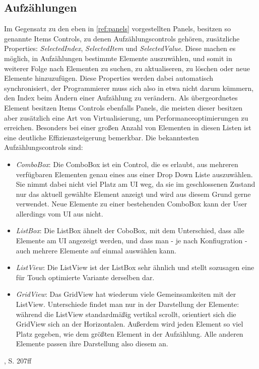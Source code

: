 \documentclass[a4paper,bibtotoc,oneside]{scrbook}
\begin{document}
\subsection[Aufzählungen]{Aufzählungen}
Im Gegensatz zu den eben in \ref{ref:panels} vorgestellten Panels, besitzen so genannte Items Controls, zu denen Aufzählungscontrols gehören, zusätzliche Properties: \textit{SelectedIndex}, \textit{SelectedItem} und \textit{SelectedValue}. Diese machen es möglich, in Aufzählungen bestimmte Elemente auszuwählen, und somit in weiterer Folge nach Elementen zu suchen, zu aktualiseren, zu löschen oder neue Elemente hinzuzufügen.
\newline
Diese Properties werden dabei automatisch synchronisiert, der Programmierer muss sich also in etwa nicht darum kümmern, den Index beim Ändern einer Aufzählung zu verändern.
\newline
\newline
Als übergeordnetes Element besitzen Items Controls ebenfalls Panels, die meisten dieser besitzen aber zusätzlich eine Art von Virtualisierung, um Performanceoptimierungen zu erreichen. Besonders bei einer großen Anzahl von Elementen in diesen Listen ist eine deutliche Effizienzsteigerung bemerkbar.
\newline
\newline
Die bekanntesten Aufzählungscontrols sind:
\begin{itemize}
\item \textit{ComboBox}: Die ComboBox ist ein Control, die es erlaubt, aus mehreren verfügbaren Elementen genau eines aus einer Drop Down Liste auszuwählen. Sie nimmt dabei nicht viel Platz am UI weg, da sie im geschlossenen Zustand nur das aktuell gewählte Element anzeigt und wird aus diesem Grund gerne verwendet. Neue Elemente zu einer bestehenden ComboBox kann der User allerdings vom UI aus nicht.
\newline
\item \textit{ListBox}: Die ListBox ähnelt der CoboBox, mit dem Unterschied, dass alle Elemente am UI angezeigt werden, und dass man - je nach Konfiugration - auch mehrere Elemente auf einmal auswählen kann.
\newline
\item \textit{ListView}: Die ListView ist der ListBox sehr ähnlich und stellt sozusagen eine für Touch optimierte Variante derselben dar.
\newline
\item \textit{GridView}: Das GridView hat wiederum viele Gemeinsamkeiten mit der ListView. Unterschiede findet man nur in der Darstellung der Elemente: während die ListView standardmäßig vertikal scrollt, orientiert sich die GridView sich an der Horizontalen. Außerdem wird jeden Element so viel Platz gegeben, wie dem größten Element in der Aufzählung. Alle anderen Elemente passen ihre Darstellung also diesem an.
\end{itemize}
 \cite{ana12}, S. 207ff
\end{document}
